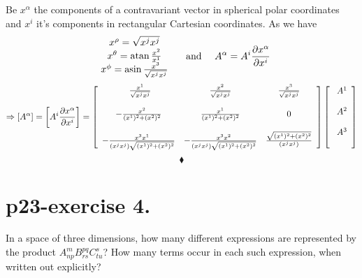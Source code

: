 Be $x^{\alpha}$ the components of a contravariant vector in spherical polar coordinates and $x^{i}$ it's components in rectangular Cartesian coordinates. As we have  
\begin{align}
 \begin{array}{c}
    \ x^{\rho} = \sqrt{x^{j}x^{j}}\\
    \ x^{\theta} = \atan{\frac{x^{2}}{x^{1}}}\\
    \ x^{\phi} = \asin{\frac{x^{3}}{\sqrt{{x^{j}x^{j}}}}}\\
  \end{array} \quad \text{ and } \quad A^{\alpha} = A^{i}\pdv{x^{\alpha}}{x^{i}}
  \end{align}
\begin{align}
\Rightarrow \left[A^{\alpha} \right]=  \left[A^{i}\pdv{x^{\alpha}}{x^{i}}\right] = \left[ {\begin{array}{ccc}
    \ \frac{x^1} { \sqrt{x^{j}x^{j}}} & \frac{x^2} { \sqrt{x^{j}x^{j}}} & \frac{x^3} { \sqrt{x^{j}x^{j}}}\\\\
    -\frac{x^2} { (x^1)^2+(x^2)^2} & \frac{x^1} { (x^1)^2+(x^2)^2}  & 0 \\\\
    -\frac{x^3x^1} { (x^{j}x^{j})\sqrt{(x^1)^2+(x^2)^2}} & -\frac{x^3x^2} { (x^{j}x^{j})\sqrt{(x^1)^2+(x^2)^2}}  & \frac{\sqrt{(x^1)^2+(x^2)^2}} { (x^{j}x^{j})} \\
  \end{array} } \right]\left[ {\begin{array}{c}
    \ A^{1}\\\\
    \ A^{2}\\\\
    \ A^{3}\\\\
  \end{array} } \right]
\end{align}
$$\blacklozenge$$
\pagebreak[4]

\section{p23-exercise 4.}
\begin{tcolorbox}
In a space of three dimensions, how many different expressions are represented by the product $A^{m}_{np} B^{pq}_{rs}C^{s}_{tu}$? How many terms occur in each such expression, when written out explicitly?
\end{tcolorbox}

